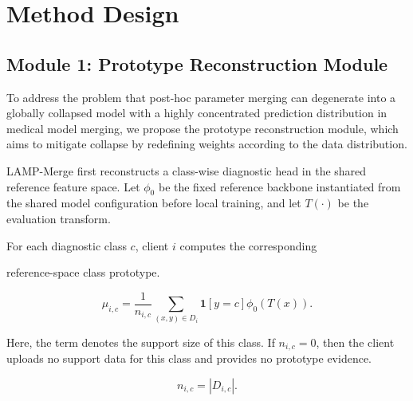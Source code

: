 \documentclass[letterpaper]{article}
\begin{document}
\section{Method Design}

\subsection{Module 1: Prototype Reconstruction Module}

To address the problem that post-hoc parameter merging can degenerate into a globally collapsed model with a highly concentrated prediction distribution in medical model merging, we propose the prototype reconstruction module, which aims to mitigate collapse by redefining weights according to the data distribution.


LAMP-Merge first reconstructs a class-wise diagnostic head in the shared reference feature space. Let $\phi_0$ be the fixed reference backbone instantiated from the shared model configuration before local training, and let $T(\cdot)$ be the evaluation transform.

For each diagnostic class $c$, client $i$ computes the corresponding


reference-space class prototype.


\begin{equation}
\mu_{i,c}=\frac{1}{n_{i,c}}\sum_{(x,y)\in D_i}\mathbf{1}[y=c]\phi_0(T(x)).
\end{equation}

Here, the term denotes the support size of this class. If $n_{i,c}=0$, then the client uploads no support data for this class and provides no prototype evidence.

\begin{equation}
n_{i,c}=|D_{i,c}|.
\end{equation}
\end{document}
